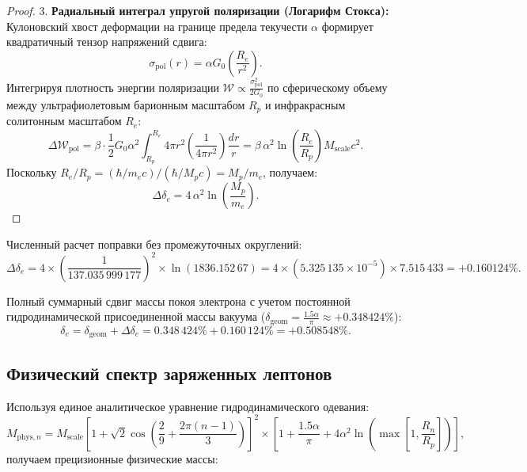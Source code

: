 \documentclass[12pt,a4paper]{article}
\begin{document}
\begin{proof}
		3. \textbf{Радиальный интеграл упругой поляризации (Логарифм Стокса):}
		Кулоновский хвост деформации на границе предела текучести $\alpha$ формирует квадратичный тензор напряжений сдвига:
		\begin{equation}
			\sigma_{\text{pol}}(r) = \alpha G_0 \left( \frac{R_e}{r^2} \right).
		\end{equation}
		Интегрируя плотность энергии поляризации $\mathcal{W} \propto \frac{\sigma_{\text{pol}}^2}{2 G_0}$ по сферическому объему между ультрафиолетовым барионным масштабом $R_p$ и инфракрасным солитонным масштабом $R_e$:
		\begin{equation}
			\Delta \mathcal{W}_{\text{pol}} = \beta \cdot \frac{1}{2} G_0 \alpha^2 \int_{R_p}^{R_e} 4\pi r^2 \left( \frac{1}{4\pi r^2} \right) \frac{dr}{r} = \beta \, \alpha^2 \ln\left( \frac{R_e}{R_p} \right) M_{\text{scale}} c^2.
		\end{equation}
		Поскольку $R_e / R_p = (\hbar / m_e c) / (\hbar / M_p c) = M_p / m_e$, получаем:
		\begin{equation}
			\Delta \delta_e = 4 \, \alpha^2 \ln\left( \frac{M_p}{m_e} \right).
		\end{equation}
	\end{proof}
	
	Численный расчет поправки без промежуточных округлений:
	\begin{equation}
		\Delta \delta_e = 4 \times \left( \frac{1}{137.035\,999\,177} \right)^2 \times \ln(1836.152\,67) = 4 \times (5.325\,135 \times 10^{-5}) \times 7.515\,433 = \mathbf{+0.160124\%}.
	\end{equation}
	
	Полный суммарный сдвиг массы покоя электрона с учетом постоянной гидродинамической присоединенной массы вакуума ($\delta_{\text{geom}} = \frac{1.5\alpha}{\pi} \approx +0.348424\%$):
	\begin{equation}
		\delta_e = \delta_{\text{geom}} + \Delta \delta_e = 0.348\,424\% + 0.160\,124\% = \mathbf{+0.508548\%}.
	\end{equation}
	
	\subsection{Физический спектр заряженных лептонов}
	Используя единое аналитическое уравнение гидродинамического одевания:
	\begin{equation}
		M_{\text{phys}, n} = M_{\text{scale}} \left[ 1 + \sqrt{2} \cos\left( \frac{2}{9} + \frac{2\pi(n-1)}{3} \right) \right]^2 \times \left[ 1 + \frac{1.5 \alpha}{\pi} + 4 \alpha^2 \ln\left( \max\left[ 1, \frac{R_n}{R_p} \right] \right) \right],
	\end{equation}
	получаем прецизионные физические массы:
	
\end{document}
